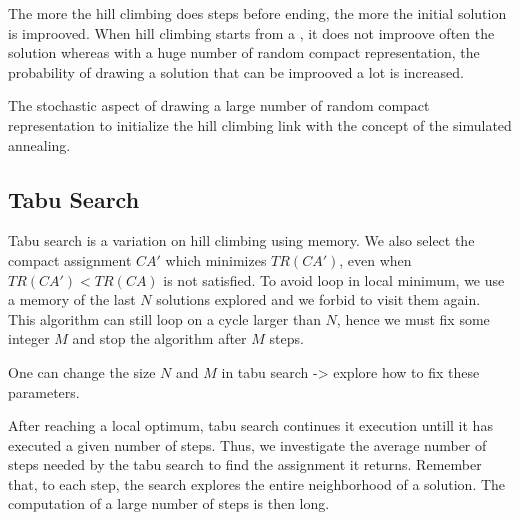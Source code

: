 \documentclass[english]{article}
\begin{document}
 The more the hill climbing does steps before ending, the more the initial solution is improoved. When hill climbing starts from a \hybridgreedynormalized, it does not improove often the solution whereas with a huge number of random compact representation, the probability of drawing a solution that can be improoved a lot is increased.
 
 The stochastic aspect of drawing a large number of random compact representation to initialize the hill climbing link with the concept of the simulated annealing.
\subsection{Tabu Search}

Tabu search is a variation on hill climbing using memory. We also select the compact assignment $CA'$ which minimizes 
$TR(CA')$, even when $TR(CA') < TR(CA)$ is not satisfied. To avoid loop in local minimum, we use a memory of the last 
$N$ solutions explored and we forbid to visit them again. This algorithm can still loop on a cycle larger than $N$,
hence we must fix some integer $M$ and stop the algorithm after $M$ steps.


One can change the size $N$ and $M$ in tabu search -> explore how to fix these parameters. 

After reaching a local optimum, tabu search continues it execution untill it has executed a given number of steps.
Thus, we investigate the average number of steps needed by the tabu search to find the assignment it returns. Remember that, to each step, the search explores the entire neighborhood of a solution. The computation of a large number of steps is then long.
\end{document}
